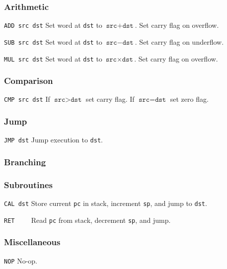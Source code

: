 \documentclass[a5paper,onecolumn,final,10pt]{memoir}
\begin{document}
\subsubsection*{Arithmetic}

\noindent\texttt{ADD src dst} \quad Set word at \texttt{dst} to $\texttt{src}+\texttt{dst}$. Set carry flag on overflow.

\noindent\texttt{SUB src dst} \quad Set word at \texttt{dst} to $\texttt{src}-\texttt{dst}$. Set carry flag on underflow.

\noindent\texttt{MUL src dst} \quad Set word at \texttt{dst} to $\texttt{src}×\texttt{dst}$. Set carry flag on overflow.

\subsubsection*{Comparison}

\noindent\texttt{CMP src dst} \quad If $\texttt{src}>\texttt{dst}$ set carry flag. If $\texttt{src}=\texttt{dst}$ set zero flag.

\subsubsection*{Jump}

\noindent\texttt{JMP dst} \quad Jump execution to \texttt{dst}.

\subsubsection*{Branching}

\subsubsection*{Subroutines}

\noindent\texttt{CAL dst} \quad Store current \texttt{pc} in stack, increment \texttt{sp}, and jump to \texttt{dst}.

\noindent\texttt{RET~~~~} \quad Read \texttt{pc} from stack, decrement \texttt{sp}, and jump.

\subsubsection*{Miscellaneous}

\noindent\texttt{NOP} \quad No-op.
\end{document}
